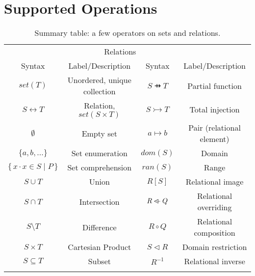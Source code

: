 \documentclass{article}
\newcommand{\bSet}[3]{%
  \{\, #1 \cdot #2 \mid #3 \, \}%
}
\begin{document}
\section{Supported Operations}
\begin{table}[H]
    \centering
    \caption{Summary table: a few operators on sets and relations.}
    \begin{tabular}{|c|c||c|c|}
    \hhline{|--||--|}
    \multicolumn{2}{|c||}{Sets} & \multicolumn{2}{|c|}{Relations} \\
    \hhline{:==::==:}
    Syntax & Label/Description & Syntax & Label/Description\\
    \hhline{|--||--|}
    $set(T)$ & Unordered, unique collection             & $S \pfun T$ & Partial function \\
    $S \leftrightarrow T$ & Relation, $set(S\times T)$  & $S \tinj T$& Total injection\\
    $\emptyset$ & Empty set                             & $a \mapsto b$ & Pair (relational element) \\
    $\{a,b,...\}$ & Set enumeration                     & $dom(S)$ & Domain\\
    $\bSet{x}{x \in S}{P}$ & Set comprehension          & $ran(S)$ & Range\\
    $S \cup T$ & Union                                  & $R[S]$ & Relational image\\
    $S \cap T$ & Intersection                           & $R \mathbin{\lhd\mkern-9mu-} Q$ & Relational overriding\\
    $S \setminus T$ & Difference                        & $R \circ Q$ & Relational composition\\
    $S \times T$ & Cartesian Product                    & $S \triangleleft R$ & Domain restriction\\
    $S \subseteq T$ & Subset                            & $R^{-1}$ & Relational inverse\\
    \hhline{|--||--|}
    \end{tabular}
    \label{tab:ADTOps}
\end{table}
\end{document}
